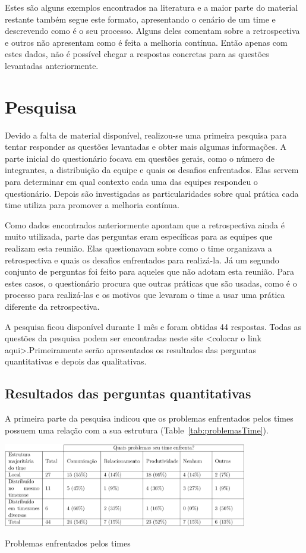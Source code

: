 \documentclass[12pt]{article}
\begin{document}
Estes são alguns exemplos encontrados na literatura e a maior parte do material restante também segue este formato, apresentando o cenário de um time e descrevendo como é o seu processo. Alguns deles comentam sobre a retrospectiva e outros não apresentam como é feita a melhoria contínua. Então apenas com estes dados, não é possível chegar a respostas concretas para as questões levantadas anteriormente.

\section{Pesquisa} \label{sec:firstpage}

Devido a falta de material disponível, realizou-se uma primeira pesquisa  para tentar responder as questões levantadas e obter mais algumas informações. A parte inicial do questionário focava em questões gerais, como o número de integrantes, a distribuição da equipe e quais os desafios enfrentados. Elas servem para determinar em qual contexto cada uma das equipes respondeu o questionário. Depois são investigadas as particularidades sobre qual prática cada time utiliza para promover a melhoria contínua.

Como dados encontrados anteriormente apontam que a retrospectiva ainda é muito utilizada, parte das perguntas eram específicas para as equipes que realizam esta reunião. Elas questionavam sobre como o time organizava a retrospectiva e quais os desafios enfrentados para realizá-la. Já um segundo conjunto de perguntas foi feito para aqueles que não adotam esta reunião. Para estes casos, o questionário procura que outras práticas que são usadas, como é o processo para realizá-las e os motivos que levaram o time a usar uma prática diferente da retrospectiva.

A pesquisa ficou disponível durante 1 mês e foram obtidas 44 respostas. Todas as questões da pesquisa podem ser encontradas neste site <colocar o link aqui>.Primeiramente serão apresentados os resultados das perguntas quantitativas e depois das qualitativas.

\subsection{Resultados das perguntas quantitativas}

A primeira parte da pesquisa indicou que os problemas enfrentados pelos times possuem uma relação com a sua estrutura (Table~\ref{tab:problemasTime}).

\begin{table}[ht]
\centering
\includegraphics[width=0.8\textwidth]{problemasTime.png}
\caption{Problemas enfrentados pelos times}
\label{tab:problemasTime}
\end{table}
\end{document}
